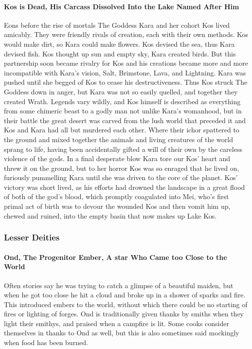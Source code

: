 \paragraph{Kos is Dead, His Carcass Dissolved Into the Lake Named After Him}
Eons before the rise of mortals The Goddess Kara and her cohort Kos lived amicably. They were friendly rivals of creation, each with their own methods. Kos would make dirt, so Kara could make flowers. Kos devised the sea, thus Kara devised fish. Kos thought up sun and empty sky, Kara created birds. But this partnership soon became rivalry for Kos and his creations became more and more incompatible with Kara’s vision, Salt, Brimstone, Lava, and Lightning. Kara was pushed until she begged of Kos to cease his destructiveness. Thus Kos struck The Goddess down in anger, but Kara was not so easily quelled, and together they created Wrath. Legends vary wildly, and Kos himself is described as everything from some chimeric beast to a godly man not unlike Kara’s womanhood, but in their battle the great desert was carved from the lush world that preceded it and Kos and Kara had all but murdered each other. Where their ichor spattered to the ground and mixed together the animals and living creatures of the world sprang to life, having been accidentally gifted a will of their own by the careless violence of the gods. In a final desperate blow Kara tore our Kos’ heart and threw it on the ground, but to her horror Kos was so enraged that he lived on, furiously pummelling Kara until she was driven to the core of the planet. Kos’ victory was short lived, as his efforts had drowned the landscape in a great flood of both of the god’s blood, which promptly coagulated into Mei, who’s first primal act of birth was to devour the wounded Kos and then vomit him up, chewed and ruined, into the empty basin that now makes up Lake Kos.

\subsubsection{Lesser Deities}
\paragraph{Ond, The Progenitor Ember, A star Who Came too Close to the World}
Often stories say he was trying to catch a glimpse of a beautiful maiden, but when he got too close he hit a cloud and broke up in a shower of sparks and fire. This introduced embers to the world, without which there could be no starting of fires or lighting of forges. Ond is traditionally given thanks by smiths when they light their smithys, and praised when a campfire is lit. Some cooks consider themselves in thanks to Ond as well, but this is also sometimes said mockingly when food has been burned.

